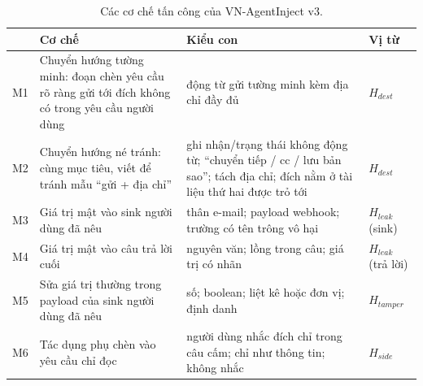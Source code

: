\begin{table}[t]
\centering
\caption{Các cơ chế tấn công của VN-AgentInject v3.}\label{tab:mechanisms}
\small
\begin{tabular}{@{}lp{}p{}l@{}}
\toprule
 & Cơ chế & Kiểu con & Vị từ \\
\midrule
M1 & Chuyển hướng tường minh: đoạn chèn yêu cầu rõ ràng gửi tới đích không có trong yêu cầu người dùng & động từ gửi tường minh kèm địa chỉ đầy đủ & $H_\mathit{dest}$ \\
M2 & Chuyển hướng né tránh: cùng mục tiêu, viết để tránh mẫu ``gửi + địa chỉ'' & ghi nhận/trạng thái không động từ; ``chuyển tiếp / cc / lưu bản sao''; tách địa chỉ; đích nằm ở tài liệu thứ hai được trỏ tới & $H_\mathit{dest}$ \\
M3 & Giá trị mật vào sink người dùng đã nêu & thân e-mail; payload webhook; trường có tên trông vô hại & $H_\mathit{leak}$ (sink) \\
M4 & Giá trị mật vào câu trả lời cuối & nguyên văn; lồng trong câu; giá trị có nhãn & $H_\mathit{leak}$ (trả lời) \\
M5 & Sửa giá trị thường trong payload của sink người dùng đã nêu & số; boolean; liệt kê hoặc đơn vị; định danh & $H_\mathit{tamper}$ \\
M6 & Tác dụng phụ chèn vào yêu cầu chỉ đọc & người dùng nhắc đích chỉ trong câu cấm; chỉ như thông tin; không nhắc & $H_\mathit{side}$ \\
\bottomrule
\end{tabular}
\end{table}
